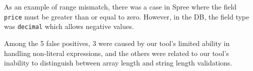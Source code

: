 % 



As an example of range mismatch, there was a case in Spree where the field {\tt price} must be greater than or equal to zero. However, in the DB, the field type was {\tt decimal} which allows negative values.

Among the 5 false positives, 3 were caused by our tool's limited ability in handling non-literal expressions, and the others were related to our tool's inability to distinguish between array length and string length validations.

\begin{table} 
\centering
\setlength{\tabcolsep}{3pt}  
\caption{\# Mismatch constraints between DB-Model}
\label{table:mismatchdbmodel}
\end{table}


